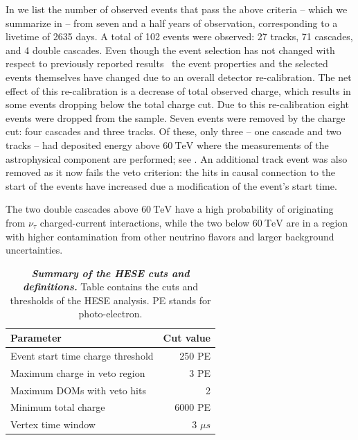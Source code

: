 In  we list the number of observed events that pass the above criteria -- which we summarize in  -- from seven and a half years of observation, corresponding to a livetime of 2635 days.
A total of 102 events were observed: 27 tracks, 71 cascades, and 4 double cascades.
Even though the event selection has not changed with respect to previously reported results~\cite{Aartsen:2013jdh,Aartsen:2014gkd,Aartsen:2015zva,Aartsen:2017mau} the event properties and the selected events themselves have changed due to an overall detector re-calibration.
The net effect of this re-calibration is a decrease of total observed charge, which results in some events dropping below the total charge cut.
Due to this re-calibration eight events were dropped from the sample.
Seven events were removed by the charge cut: four cascades and three tracks.
Of these, only three -- one cascade and two tracks -- had deposited energy above $\SI{60}\TeV$ where the measurements of the astrophysical component are performed; see .
An additional track event was also removed as it now fails the veto criterion: the hits in causal connection to the start of the events have increased due a modification of the event's start time.

The two double cascades above $\SI{60}\TeV$ have a high probability of originating from $\nu_\tau$ charged-current interactions, while the two below $\SI{60}\TeV$ are in a region with higher contamination from other neutrino flavors and larger background uncertainties.

\begin{table}[t!]
	\centering
	\begin{tabular}{l r}  %
		Parameter & Cut value \\ [0.5ex] %
		\toprule                    %
		Event start time charge threshold & 250 PE  \\
		Maximum charge in veto region & 3 PE  \\
		Maximum DOMs with veto hits & 2 \\
		Minimum total charge & 6000 PE  \\
		Vertex time window & 3 $\mu s$  \\
	\end{tabular}
	\internallinenumbers
	\caption{\textbf{\textit{Summary of the HESE cuts and definitions.}} Table contains the cuts and thresholds of the HESE analysis.
		PE stands for photo-electron.}\label{tbl:hese_cuts}  %
\end{table}


